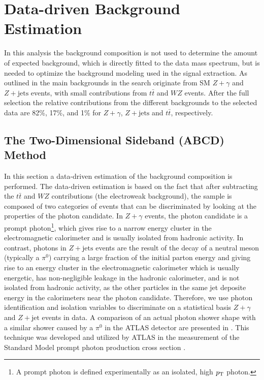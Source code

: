 \section{Data-driven Background Estimation}
\label{sec:compare}

In this analysis the background composition is not used to determine the amount of
expected background, which is directly fitted to the data mass spectrum, but is
needed to optimize the background modeling used in the signal extraction. As outlined
in  the main backgrounds in the \HToZg search originate
from SM $Z+\gamma$ and $Z+\text{jets}$ events, with 
small contributions from $t \bar t$ and $WZ$ events.
After the full selection the relative contributions from the different backgrounds
to the selected data are 82\%, 17\%, and 1\% for $Z+\gamma$, $Z+\text{jets}$ and
$t\bar t$, respectively.

\subsection{The Two-Dimensional Sideband (ABCD) Method}
In this section a data-driven estimation of the background composition is
performed. The data-driven estimation is based on the fact that after subtracting
the $t \bar t$ and $WZ$ contributions (the electroweak background), 
the sample is composed of two categories
of events that can be discriminated by looking at the properties of the 
photon candidate. In $Z+\gamma$ events, the photon candidate is a 
prompt photon\footnote{A prompt photon is defined experimentally as an
isolated, high $p_{\mathrm{T}}$ photon.},
which gives rise to a narrow energy cluster in the electromagnetic calorimeter and
is usually isolated from hadronic activity. In contrast, photons in $Z+\text{jets}$
events are the result of the decay of a neutral meson (typically a $\pi^0$)
carrying a large fraction of the initial parton energy and giving rise to an
energy cluster in the electromagnetic calorimeter which is usually energetic,
has non-negligible leakage in the hadronic calorimeter, and is not isolated from
hadronic activity, as the other particles in the same jet deposite energy in the
calorimeters near the photon candidate. Therefore, we use photon identification
and isolation variables to discriminate on a statistical basis $Z+\gamma$ and
$Z+\text{jet}$ events in data. A comparison of an actual photon shower shape
with a similar shower caused by a $\pi^0$ in the ATLAS detector are presented
in . This technique was developed and utilized
by ATLAS in the measurement of the Standard Model prompt photon production
cross section \cite{Aad:2010sp}. 

